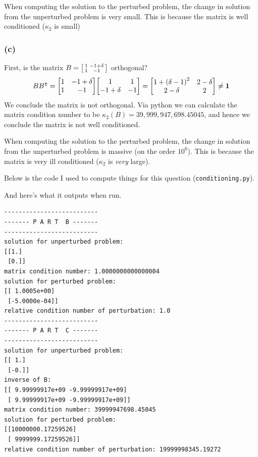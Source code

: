 \documentclass[boxes,pages]{homework}
\newcommand{\tpose}[1]{#1^\intercal}
\begin{document}
\begin{solution}
	When computing the solution to the perturbed problem, the change in solution from the unperturbed problem is very small. This is because the matrix is well conditioned ($\kappa_2$ is small)

	\subsubsection*{(c)}
	First, is the matrix $B = \smqty[1 & -1 + \delta \\ 1 & -1]$ orthogonal?
	\begin{equation*}
		B\tpose{B} = \mqty[1 & -1 + \delta \\ 1 & -1]\mqty[1 & 1 \\ -1 + \delta & -1] = \mqty[1 + \qty(\delta - 1)^2 & 2 - \delta \\ 2 - \delta & 2] \neq \mathbf{1}
	\end{equation*}
	We conclude the matrix is not orthogonal. Via python we can calculate the matrix condition number to be $\kappa_2(B) = 39,999,947,698.45045$, and hence we conclude the matrix is not well conditioned.

	When computing the solution to the perturbed problem, the change in solution from the unperturbed problem is massive (on the order $10^6$). This is because the matrix is very ill conditioned ($\kappa_2$ is \emph{very} large).

	Below is the code I used to compute things for this question (\verb+conditioning.py+).
	
	And here's what it outputs when run.
	\begin{verbatim}
--------------------------
------- P A R T  B -------
--------------------------
solution for unperturbed problem:
[[1.]
 [0.]]
matrix condition number: 1.0000000000000004
solution for perturbed problem:
[[ 1.0005e+00]
 [-5.0000e-04]]
relative condition number of perturbation: 1.0
--------------------------
------- P A R T  C -------
--------------------------
solution for unperturbed problem:
[[ 1.]
 [-0.]]
inverse of B:
[[ 9.99999917e+09 -9.99999917e+09]
 [ 9.99999917e+09 -9.99999917e+09]]
matrix condition number: 39999947698.45045
solution for perturbed problem:
[[10000000.17259526]
 [ 9999999.17259526]]
relative condition number of perturbation: 19999998345.19272
	\end{verbatim}
\end{solution}
\end{document}
